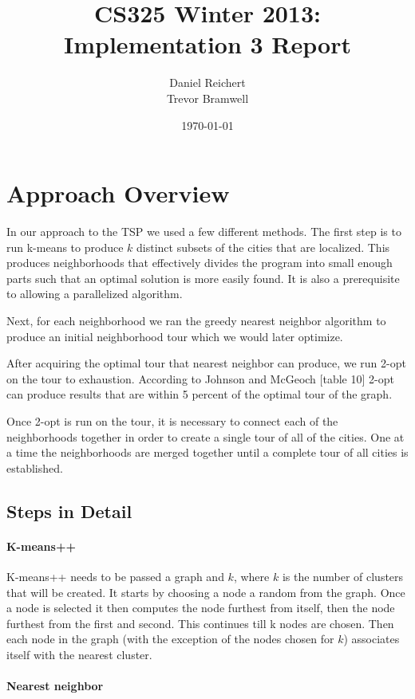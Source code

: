 \documentclass[12pt]{article}
\title{CS325 Winter 2013: Implementation 3 Report}
\author{
    Daniel Reichert \\
    Trevor Bramwell
}
\date{\today}
\begin{document}
\maketitle

\section*{Approach Overview}

In our approach to the TSP we used a few different methods.  The first step is
to run k-means to produce $k$ distinct subsets of the cities that are
localized.  This produces neighborhoods that effectively divides the program
into small enough parts such that an optimal solution is more easily found.  It
is also a prerequisite to allowing a parallelized algorithm.  

Next, for each neighborhood we ran the greedy nearest neighbor algorithm to
produce an initial neighborhood tour which we would later optimize.

After acquiring the optimal tour that nearest neighbor can produce, we run
2-opt on the tour to exhaustion. According to Johnson and McGeoch [table 10]
2-opt can produce results that are within 5 percent of the optimal tour of the
graph.

Once 2-opt is run on the tour, it is necessary to connect each of the
neighborhoods together in order to create a single tour of all of the cities.
One at a time the neighborhoods are merged together until a complete tour of
all cities is established.

\subsection*{Steps in Detail}

\paragraph{K-means++}

K-means++ needs to be passed a graph and $k$, where $k$ is the number of
clusters that will be created. It starts by choosing a node a random
from the graph. Once a node is selected it then computes the node
furthest from itself, then the node furthest from the first and second.
This continues till k nodes are chosen. Then each node in the graph
(with the exception of the nodes chosen for $k$) associates itself with
the nearest cluster.

\paragraph{Nearest neighbor}
\end{document}
